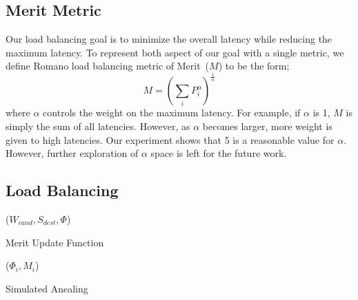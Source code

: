 \subsection{Merit Metric}
Our load balancing goal is to minimize the overall latency while reducing the maximum latency.
To represent both aspect of our goal with a single metric, we define Romano load balancing metric of Merit~($M$) to be the form;
\begin{equation}\label{merit}
M=\left(\sum_iP_i^\alpha\right)^\frac{1}{\alpha}
\end{equation}
where $\alpha$ controls the weight on the maximum latency.
For example, if $\alpha$ is 1, $M$ is simply the sum of all latencies.
However, as $\alpha$ becomes larger, more weight is given to high latencies.
Our experiment shows that 5 is a reasonable value for $\alpha$.
However, further exploration of $\alpha$ space is left for the future work.

\subsection{Load Balancing}

\begin{algorithm}[!t]
\DontPrintSemicolon
{}
\updateMerit($W_{cand}, S_{dest}, \Phi$)
\caption{Merit Update Function}\label{malgo}
\end{algorithm}

\begin{algorithm}[!t]
\DontPrintSemicolon
{}
\minimizeMerit($\Phi_i, M_i$)
\caption{Simulated Anealing}\label{salgo}
\end{algorithm}


